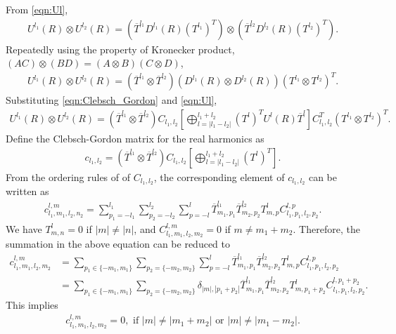 \documentclass[onecolumn,11pt]{IEEEtran}
\newcommand{\bracket}[1]{\ensuremath{\left[ #1 \right]}}
\begin{document}
From \eqref{eqn:Ul},
\begin{align*}
    U^{l_1}(R) \otimes U^{l_2}(R) = (\overline{T}^{l_1} D^{l_1}(R) (T^{l_1})^T) \otimes (\overline{T}^{l_2} D^{l_2}(R) (T^{l_2})^T) .
\end{align*}
Repeatedly using the property of Kronecker product, $(AC)\otimes (BD) = (A\otimes B)(C \otimes D)$, 
\begin{align*}
    U^{l_1}(R) \otimes U^{l_2}(R) = (\overline{T}^{l_1} \otimes \overline{T}^{l_2}) (D^{l_1}(R) \otimes D^{l_2}(R)) (T^{l_1} \otimes   T^{l_2})^T .
\end{align*}
Substituting \eqref{eqn:Clebsch_Gordon} and \eqref{eqn:Ul},
\begin{align*}
    U^{l_1}(R) \otimes U^{l_2}(R) = (\overline{T}^{l_1} \otimes \overline{T}^{l_2}) C_{l_1,l_2} \bracket{ \bigoplus_{l=|l_1-l_2|}^{l_1+l_2} (T^l)^T U^l(R) \overline{T}^l } C_{l_1,l_2}^T (T^{l_1} \otimes   T^{l_2})^T .
\end{align*}
Define the Clebsch-Gordon matrix for the real harmonics as
\begin{align}
    c_{l_1,l_2} = (\overline{T}^{l_1} \otimes \overline{T}^{l_2}) C_{l_1,l_2} \bracket{ \bigoplus_{l=|l_1-l_2|}^{l_1+l_2} (T^l)^T }.
\end{align}
From the ordering rules of of $C_{l_1,l_2}$, the corresponding element of $c_{l_1,l_2}$ can be written as
\begin{align}
    c^{l,m}_{l_1,m_1,l_2,n_2} = \sum_{p_1=-l_1}^{l_1} \sum_{p_2 = -l_2}^{l_2} \sum_{p=-l}^l \overline T^{l_1}_{m_1,p_1} \overline T^{l_2}_{m_2,p_2} T^l_{m,p} C^{l,p}_{l_1,p_1,l_2,p_2}.
\end{align}
We have $T^l_{m,n}=0$ if $|m|\neq|n|$, and $C^{l,m}_{l_1,m_1,l_2,m_2}=0$ if $m\neq m_1+m_2$. 
Therefore, the summation in the above equation can be reduced to
\begin{align}
    c^{l,m}_{l_1,m_1,l_2,m_2} & = \sum_{p_1\in\{-m_1,m_1\}} \sum_{p_2 =\{ -m_2,m_2\}} \sum_{p=-l}^l \overline T^{l_1}_{m_1,p_1} \overline T^{l_2}_{m_2,p_2} T^l_{m,p} C^{l,p}_{l_1,p_1,l_2,p_2}\\
                              & = \sum_{p_1\in\{-m_1,m_1\}} \sum_{p_2 =\{ -m_2,m_2\}} \delta_{|m|,|p_1+p_2|} \overline T^{l_1}_{m_1,p_1} \overline T^{l_2}_{m_2,p_2} T^l_{m,p_1+p_2} C^{l,p_1+p_2}_{l_1,p_1,l_2,p_2}.
\end{align}
This implies
\begin{align*}
    c^{l,m}_{l_1,m_1,l_2,m_2} = 0, \text{ if  $|m|\neq |m_1+m_2|$ or $|m|\neq |m_1-m_2|$}.
\end{align*}
\end{document}
